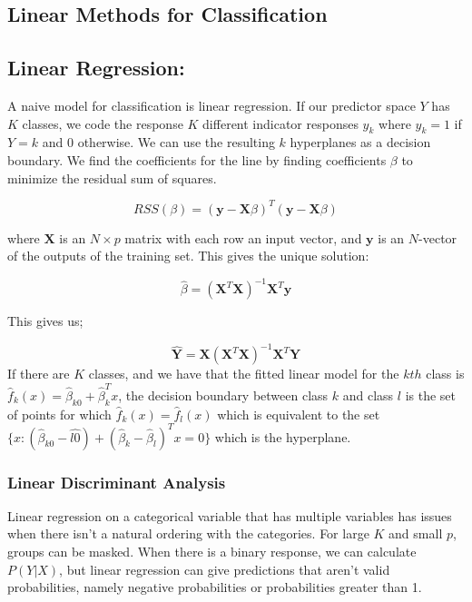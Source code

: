 \documentclass[12pt,twoside]{reedthesis}
\theoremstyle{definition}
\theoremstyle{definition}
\theoremstyle{definition}
\theoremstyle{remark}
\begin{document}
\subsection{Linear Methods for
Classification}\label{linear-methods-for-classification}

\subsection{Linear Regression:}\label{linear-regression}

A naive model for classification is linear regression. If our predictor
space \(Y\) has \(K\) classes, we code the response \(K\) different
indicator responses \(y_k\) where \(y_k = 1\) if \(Y = k\) and 0
otherwise. We can use the resulting \(k\) hyperplanes as a decision
boundary. We find the coefficients for the line by finding coefficients
\(\beta\) to minimize the residual sum of squares.

\[ RSS(\beta) = (\textbf{y} - \textbf{X}\beta)^T(\textbf{y} - \textbf{X}\beta) \]

where \(\textbf{X}\) is an \(N\times p\) matrix with each row an input
vector, and \(\textbf{y}\) is an \(N\)-vector of the outputs of the
training set. This gives the unique solution:

\[ \hat{\beta} = (\textbf{X}^T\textbf{X})^{-1}\textbf{X}^T\textbf{y}\]

This gives us;

\[\hat{\textbf{Y}} = \textbf{X}(\textbf{X}^T\textbf{X})^{-1}\textbf{X}^T
\textbf{Y}\] If there are \(K\) classes, and we have that the fitted
linear model for the \(kth\) class is
\(\hat{f}_k(x) = \hat{\beta}_{k0} + \hat{\beta}^T_kx\), the decision
boundary between class \(k\) and class \(l\) is the set of points for
which \(\hat{f}_k(x) = \hat{f}_l(x)\) which is equivalent to the set
\(\{x: (\hat{\beta}_{k0} - \hat{l0}) + (\hat{\beta}_k - \hat{\beta}_l)^Tx = 0\}\)
which is the hyperplane.

\subsubsection{Linear Discriminant
Analysis}\label{linear-discriminant-analysis}

Linear regression on a categorical variable that has multiple variables
has issues when there isn't a natural ordering with the categories. For
large \(K\) and small \(p\), groups can be masked. When there is a
binary response, we can calculate \(P(Y|X)\), but linear regression can
give predictions that aren't valid probabilities, namely negative
probabilities or probabilities greater than 1.
\end{document}
